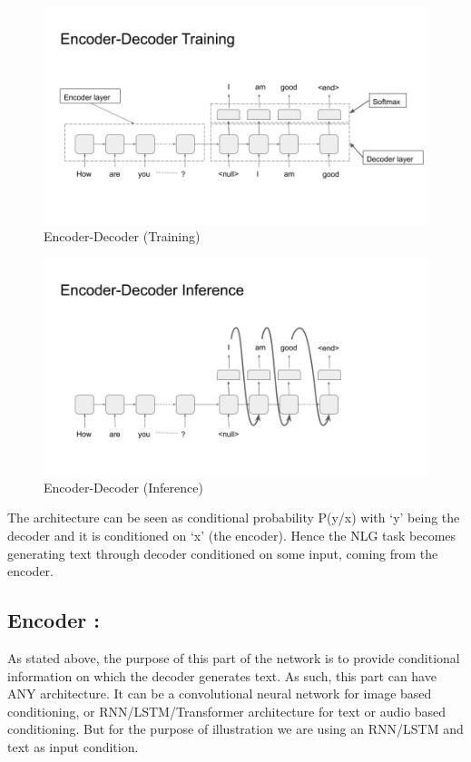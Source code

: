 \documentclass[]{krantz}
\begin{document}
\begin{figure}
\centering
\includegraphics{figures/encoder_decoder_trg.jpg}
\caption{Encoder-Decoder (Training)}
\end{figure}

\begin{figure}
\centering
\includegraphics{figures/encoder_decoder_inf.jpg}
\caption{Encoder-Decoder (Inference)}
\end{figure}

The architecture can be seen as conditional probability P(y/x) with `y' being the decoder and it is conditioned on `x' (the encoder). Hence the NLG task becomes generating text through decoder conditioned on some input, coming from the encoder.

\hypertarget{encoder}{%
\subsection{Encoder :}\label{encoder}}

As stated above, the purpose of this part of the network is to provide conditional information on which the decoder generates text. As such, this part can have ANY architecture. It can be a convolutional neural network for image based conditioning, or RNN/LSTM/Transformer architecture for text or audio based conditioning. But for the purpose of illustration we are using an RNN/LSTM and text as input condition.
\end{document}
